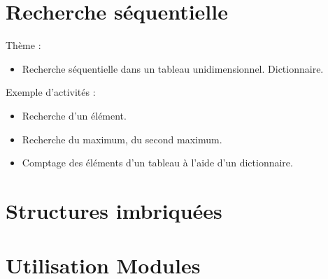 \proffalse


\section*{Recherche séquentielle}
Thème : 
\begin{itemize}
\item Recherche séquentielle dans un tableau unidimensionnel. Dictionnaire.
\end{itemize}
Exemple d'activités :
\begin{itemize}
\item Recherche d'un élément. 
\item Recherche du maximum, du second maximum. 
\item Comptage des éléments d'un tableau à l'aide d'un dictionnaire.
\end{itemize}

\renewcommand{\repExo}{../../Informatique/S1_Themes/01_RechercheSequentielle}

\renewcommand{\td}{01_AlgorithmesBasiques}
\graphicspath{{\repStyle/png/}{\repExo/\td/images/}}


\renewcommand{\td}{02_Dictionnaires}
\graphicspath{{\repStyle/png/}{\repExo/\td/images/}}


\renewcommand{\td}{03_SuiteSyracuse}
\graphicspath{{\repStyle/png/}{\repExo/\td/images/}}



\section*{Structures imbriquées}
%
%
%
%


\section*{Utilisation Modules}
%
%

